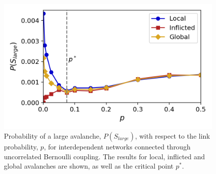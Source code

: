 \begin{figure}[!h]
	\begin{center}
	\includegraphics[scale=0.75]{./images/task_15/large_S_vs_p_joint_AB.png} 
	\end{center}
	\caption{Probability of a large avalanche, $P(S_{large})$, with respect to the link probability, $p$, for interdependent networks connected through uncorrelated Bernoulli coupling. The results for local, inflicted and global avalanches are shown, as well as the critical point $p^*$. \\} 
	\label{fig:large_S_vs_p_joint_AB} 
\end{figure}



\newpage